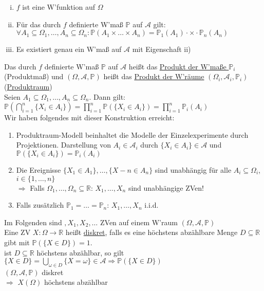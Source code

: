 \documentclass[a4paper]{article}
\newcommand{\ul}{\underline}
\begin{document}
\begin{enumerate}[i)]
	\item $f$ ist eine W'funktion auf $\Omega$
	\item Für das durch $f$ definierte W'maß $\mathbb{P}$ auf $\mathcal{A}$ gilt: $\forall A_1\subseteq\Omega_1,\dots,A_n\subseteq\Omega_n:\mathbb{P}(A_1\times\dots\times A_n)=\mathbb{P}_1(A_1)\cdot\times\cdot\mathbb{P}_n(A_n)$
	\item Es existiert genau ein W'maß auf $\mathcal{A}$ mit Eigenschaft ii)
\end{enumerate}
Das durch $f$ definierte W'maß $\mathbb{P}$ auf $\mathcal{A}$ heißt das \ul{Produkt der W'maße $\mathbb{P}_i$} (Produktmaß) und $(\Omega,\mathcal{A},\mathbb{P})$ heißt das \ul{Produkt der W'räume} $(\Omega_i,\mathcal{A}_i,\mathbb{P}_i)$ (\ul{Produktraum})\\
Seien $A_1\subseteq\Omega_1,\dots,A_n\subseteq\Omega_n$. Dann gilt: $\mathbb{P}(\bigcap_{i=1}^n\{X_i\in A_i\})=\prod_{i=1}^n\mathbb{P}(\{X_i\in A_i\})=\prod_{i=1}^n\mathbb{P}_i(A_i)$\\
Wir haben folgendes mit dieser Konstruktion erreicht:
\begin{enumerate}[1)]
	\item Produktraum-Modell beinhaltet die Modelle der Einzelexperimente durch Projektionen. Darstellung von $A_i\in\mathcal{A}_i$ durch $\{X_i\in A_i\}\in\mathcal{A}$ und $\mathbb{P}(\{X_i\in A_i\})=\mathbb{P}_i(A_i)$
	\item Die Ereignisse $\{X_1\in A_1\},\dots,\{X-n\in A_n\}$ sind unabhängig für alle $A_i\subseteq\Omega_i$, $i\in\{1,\dots,n\}$\\
	$\Rightarrow$ Falls $\Omega_1,\dots,\Omega_n\subseteq\mathbb{R}$: $X_1,\dots,X_n$ sind unabhängige ZVen!
	\item Falls zusätzlich $\mathbb{P}_1=\dots=\mathbb{P}_n$: $X_1,\dots,X_n$ i.i.d.
\end{enumerate}
Im Folgenden sind $,X_1,X_2,\dots$ ZVen auf einem W'raum $(\Omega,\mathcal{A},\mathbb{P})$\\
Eine ZV $X:\Omega\rightarrow\mathbb{R}$ heißt \ul{diskret}, falls es eine höchstens abzählbare Menge $D\subseteq\mathbb{R}$ gibt mit $\mathbb{P}(\{X\in D\})=1$.\\
ist $D\subseteq\mathbb{R}$ höchstens abzählbar, so gilt $\{X\in D\}=\bigcup_{\omega\in D}\{X=\omega\}\in\mathcal{A}\Rightarrow\mathbb{P}(\{X\in D\})$\\
$(\Omega,\mathcal{A},\mathbb{P})$ diskret\\
$\Rightarrow$ $X(\Omega)$ höchstens abzählbar\\
\end{document}
